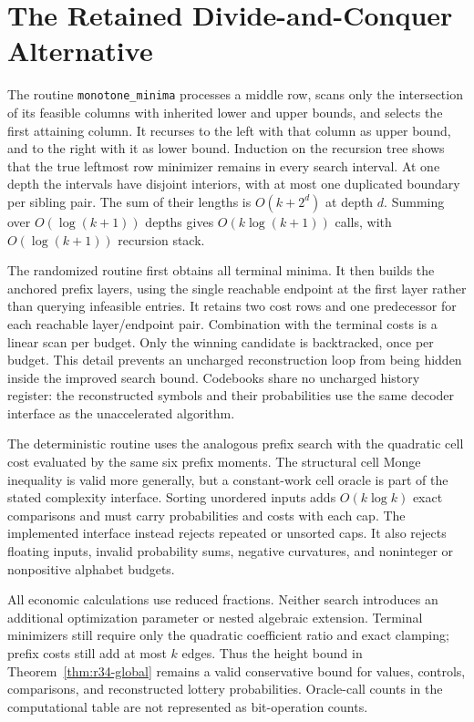 \section{The Retained Divide-and-Conquer Alternative}

The routine \texttt{monotone\_minima} processes a middle row, scans only the intersection of its feasible columns with inherited lower and upper bounds, and selects the first attaining column. It recurses to the left with that column as upper bound, and to the right with it as lower bound. Induction on the recursion tree shows that the true leftmost row minimizer remains in every search interval. At one depth the intervals have disjoint interiors, with at most one duplicated boundary per sibling pair. The sum of their lengths is $O(k+2^d)$ at depth $d$. Summing over $O(\log(k+1))$ depths gives $O(k\log(k+1))$ calls, with $O(\log(k+1))$ recursion stack.

The randomized routine first obtains all terminal minima. It then builds the anchored prefix layers, using the single reachable endpoint at the first layer rather than querying infeasible entries. It retains two cost rows and one predecessor for each reachable layer/endpoint pair. Combination with the terminal costs is a linear scan per budget. Only the winning candidate is backtracked, once per budget. This detail prevents an uncharged reconstruction loop from being hidden inside the improved search bound. Codebooks share no uncharged history register: the reconstructed symbols and their probabilities use the same decoder interface as the unaccelerated algorithm.

The deterministic routine uses the analogous prefix search with the quadratic cell cost evaluated by the same six prefix moments. The structural cell Monge inequality is valid more generally, but a constant-work cell oracle is part of the stated complexity interface. Sorting unordered inputs adds $O(k\log k)$ exact comparisons and must carry probabilities and costs with each cap. The implemented interface instead rejects repeated or unsorted caps. It also rejects floating inputs, invalid probability sums, negative curvatures, and noninteger or nonpositive alphabet budgets.

All economic calculations use reduced fractions. Neither search introduces an additional optimization parameter or nested algebraic extension. Terminal minimizers still require only the quadratic coefficient ratio and exact clamping; prefix costs still add at most $k$ edges. Thus the height bound in Theorem~\ref{thm:r34-global} remains a valid conservative bound for values, controls, comparisons, and reconstructed lottery probabilities. Oracle-call counts in the computational table are not represented as bit-operation counts.

